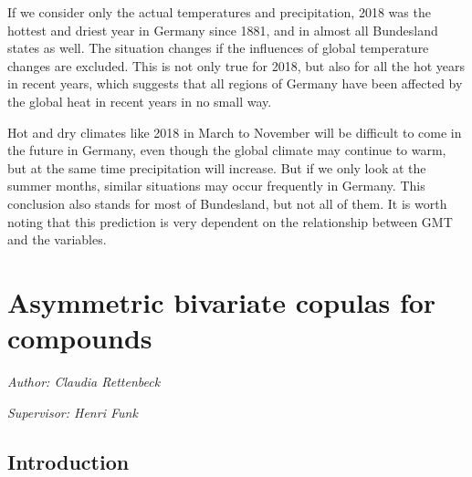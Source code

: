 \documentclass[
]{krantz}
\begin{document}
If we consider only the actual temperatures and precipitation, 2018 was the hottest and driest year in Germany since 1881, and in almost all Bundesland states as well. The situation changes if the influences of global temperature changes are excluded. This is not only true for 2018, but also for all the hot years in recent years, which suggests that all regions of Germany have been affected by the global heat in recent years in no small way.

Hot and dry climates like 2018 in March to November will be difficult to come in the future in Germany, even though the global climate may continue to warm, but at the same time precipitation will increase. But if we only look at the summer months, similar situations may occur frequently in Germany. This conclusion also stands for most of Bundesland, but not all of them. It is worth noting that this prediction is very dependent on the relationship between GMT and the variables.

\chapter{Asymmetric bivariate copulas for compounds}\label{ac}

\emph{Author: Claudia Rettenbeck}

\emph{Supervisor: Henri Funk}

\section{Introduction}\label{intro}
\end{document}
